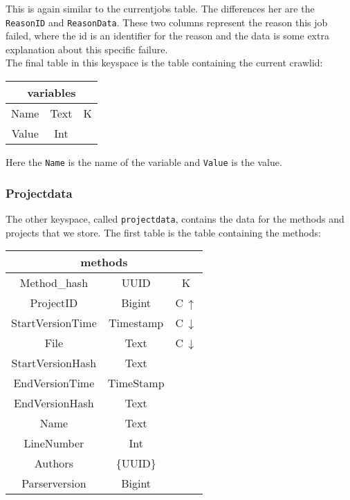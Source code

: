 \documentclass[../Main.tex]{subfiles}
\begin{document}
This is again similar to the currentjobs table. The differences her are the \texttt{ReasonID} and \texttt{ReasonData}. These two columns represent the reason this job failed, where the id is an identifier for the reason and the data is some extra explanation about this specific failure.\\

The final table in this keyspace is the table containing the current crawlid:
\begin{table}[h]
    \centering
    \begin{tabular}{|ccc|}
\hline
    \multicolumn{3}{|c|}{\textbf{variables}}   \\
    \hline
    Name & Text & K \\
    Value & Int & \\
    \hline
\end{tabular}
\end{table}

Here the \texttt{Name} is the name of the variable and \texttt{Value} is the value.

\subsubsection{Projectdata}
The other keyspace, called \texttt{projectdata}, contains the data for the methods and projects that we store. The first table is the table containing the methods:

\begin{table}[h]
    \centering
    \begin{tabular}{|ccc|}
\hline
    \multicolumn{3}{|c|}{\textbf{methods}}   \\
    \hline
    Method\_hash & UUID & K \\
    ProjectID & Bigint & C\,$\uparrow$\\
    StartVersionTime & Timestamp & C\,$\downarrow$\\
    File & Text & C\,$\downarrow$\\
    StartVersionHash & Text & \\
    EndVersionTime & TimeStamp & \\
    EndVersionHash & Text & \\
    Name & Text & \\
    LineNumber & Int & \\ 
    Authors & \{UUID\} & \\
    Parserversion & Bigint & \\
    \hline
\end{tabular}
\end{table}
\end{document}
